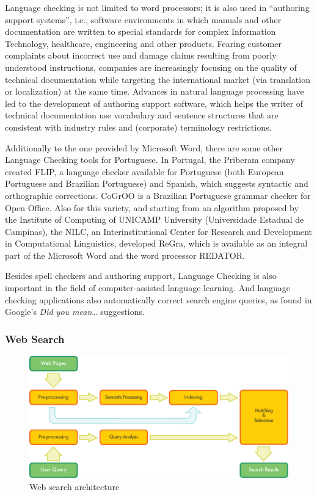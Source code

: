 \begin{multicols}{2}
 Language checking is not limited to word processors; it is also used in “authoring support systems”, i.e., software environments in which manuals and other documentation are written to special standards for complex Information Technology, healthcare, engineering and other products. Fearing customer complaints about incorrect use and damage claims resulting from poorly understood instructions, companies are increasingly focusing on the quality of technical documentation while targeting the international market (via translation or localization) at the same time. Advances in natural language processing have led to the development of authoring support software, which helps the writer of technical documentation use vocabulary and sentence structures that are consistent with industry rules and (corporate) terminology restrictions.

   Additionally to the one provided by Microsoft Word, there are some other Language Checking tools for Portuguese. In Portugal, the Priberam company created FLIP, a language checker available for Portuguese (both European Portuguese and Brazilian Portuguese) and Spanish, which suggests syntactic and orthographic corrections. CoGrOO is a Brazilian Portuguese grammar checker for Open Office. Also for this variety, and starting from an algorithm proposed by the Institute of Computing of UNICAMP University (Universidade Estadual de Campinas), the NILC, an Interinstitutional Center for Research and Development in Computational Linguistics, developed ReGra, which is available as an integral part of the Microsoft Word and the word processor REDATOR. 

Besides spell checkers and authoring support, Language Checking is also important in the field of computer-assisted language learning. And language checking applications also automatically correct search engine queries, as found in Google's \textit{Did you mean}… suggestions.

\subsubsection{Web Search}

\begin{figure}[htb]
  \center
  \includegraphics[width=\textwidth]{../_media/english/web_search_architecture}
  \caption{Web search architecture}
  \label{fig:websearcharch_en}
 \end{figure}


\end{multicols}
